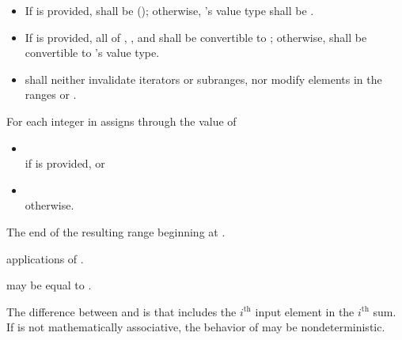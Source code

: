 \begin{itemdescr}
\pnum
\requires
\begin{itemize}
\item
  If  is provided,
   shall be  ();
  otherwise, 's value type
  shall be .
\item
  If  is provided, all of
  ,
  , and
  shall be convertible to ;
  otherwise, 
  shall be convertible to 's value type.
\item
   shall neither invalidate iterators or subranges,
  nor modify elements in
  the ranges  or .
\end{itemize}

\pnum
\effects
For each integer  in 
assigns through  the value of
\begin{itemize}
\item
  \\if {} is provided, or
\item
  \\otherwise.
\end{itemize}

\pnum
\returns
The end of the resulting range beginning at .

\pnum
\complexity
{} applications of .

\pnum
\remarks
{} may be equal to .

\pnum
\begin{note}
The difference between  and  is
that  includes the $i^\text{th}$ input element
in the $i^\text{th}$ sum.
If  is not mathematically associative,
the behavior of  may be nondeterministic.
\end{note}
\end{itemdescr}


